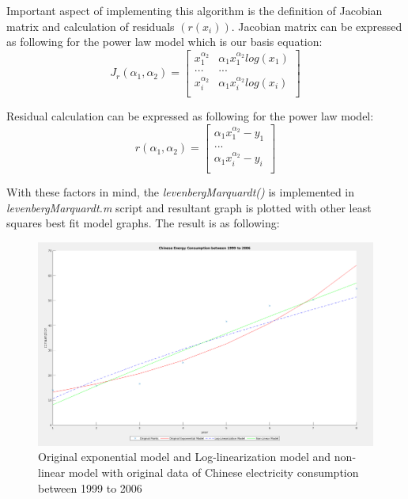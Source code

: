 \documentclass[unicode,11pt,a4paper,oneside,numbers=endperiod,openany]{scrartcl}
\begin{document}
\begin{enumerate}[label=(\alph*)]
Important aspect of implementing this algorithm is the definition of Jacobian matrix and calculation of residuals ${(r(x_i))}$. Jacobian matrix can be expressed as following for the power law model which is our basis equation: \\

\begin{equation}
 J_r(\alpha_1, \alpha_2) = \begin{bmatrix}
            x_1^{\alpha_2} & \alpha_1x_1^{\alpha_2}log(x_1) \\
            ... & ... \\
            x_i^{\alpha_2} & \alpha_1x_i^{\alpha_2}log(x_i) \\
       \end{bmatrix}
\end{equation}

\vspace{20px}

Residual calculation can be expressed as following for the power law model: \\

\begin{equation}
 r(\alpha_1, \alpha_2) = \begin{bmatrix}
            \alpha_1 x_1^{\alpha_2} - y_1\\
            ... \\
            \alpha_1 x_i^{\alpha_2} - y_i\\
       \end{bmatrix}
\end{equation}

With these factors in mind, the \textit{levenbergMarquardt()} is implemented in \textit{levenbergMarquardt.m} script and resultant graph is plotted with other least squares best fit model graphs. The result is as following: \\

 \begin{figure}[h!]
    \begin{minipage}[c]{1\linewidth}
        \centering
        \includegraphics[width=0.9\linewidth]{./figures/ex4b.png}
    \end{minipage}
  \caption{Original exponential model and Log-linearization model and non-linear model with original data of Chinese electricity consumption between 1999 to 2006}
\end{figure}


\end{enumerate}
\end{document}
